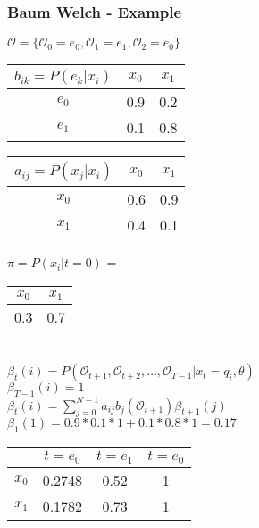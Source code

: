 \begin{frame}
	\frametitle{Baum Welch - Example}
  \begin{table}
  \centering
  $\mathcal{O} = \{\mathcal{O}_0 = e_0, \mathcal{O}_1 = e_1, \mathcal{O}_2 = e_0\}$\\
  \begin{tabular}{| c | c | c |}
  	\hline
    $b_{ik} = P(e_k|x_i)$ & $x_0$ & $x_1$ \\ \hline
    $e_0$                 & 0.9   & 0.2   \\ \hline
    $e_1$                 & 0.1   & 0.8   \\ \hline
  \end{tabular}
  \begin{tabular}{| c | c | c |}
  	\hline
    $a_{ij} = P(x_j|x_i)$ & $x_0$ & $x_1$ \\ \hline
    $x_0$                 & 0.6   & 0.9   \\ \hline
    $x_1$                 & 0.4   & 0.1   \\ \hline
  \end{tabular}
  $\pi = P(x_i|t=0)$ =
  \begin{tabular}{| c | c |}
  	\hline
    $x_0$ & $x_1$ \\ \hline
    0.3   & 0.7   \\ \hline
  \end{tabular}\\
  $\beta_t(i) = P(\mathcal{O}_{t+1}, \mathcal{O}_{t+2}, \dots, \mathcal{O}_{T-1} | x_t = q_i, \theta)$\\
  $\beta_{T-1}(i) = 1$\\
  $\beta_t(i) = \sum\limits_{j=0}^{N-1} a_{ij} b_j(\mathcal{O}_{t+1})\beta_{t+1}(j)$
  $\beta_1(1) = 0.9 * 0.1 * 1 + 0.1 * 0.8 * 1 = 0.17$
  \begin{tabular}{| c | c | c | c |}
  	\hline
          & $t=e_0$ & $t=e_1$ & $t=e_0$ \\ \hline
    $x_0$ & 0.2748  & 0.52    & 1       \\ \hline
    $x_1$ & 0.1782  & 0.73    & 1       \\ \hline
  \end{tabular}\\
\end{table}
\end{frame}

